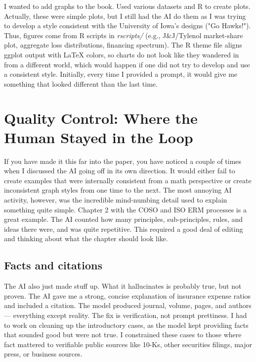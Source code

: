 \documentclass[11pt,letterpaper]{article}
\begin{document}
I wanted to add graphs to the book. Used various datasets and R to create plots. Actually, these were simple plots, but I still had the AI do them as I was trying to develop a style consistent with the University of Iowa's designs ("Go Hawks!"). Thus, figures come from R scripts in \textit{rscripts/} (e.g., J\&J/Tylenol market-share plot, aggregate loss distributions, financing spectrum). The R theme file aligns ggplot output with LaTeX colors, so charts do not look like they wandered in from a different world, which would happen if one did not try to develop and use a consistent style. Initially, every time I provided a prompt, it would give me something that looked different than the last time. 

\section{Quality Control: Where the Human Stayed in the Loop}

If you have made it this far into the paper, you have noticed a couple of times when I discussed the AI going off in its own direction. It would either fail to create examples that were internally consistent from a math perspective or create inconsistent graph styles from one time to the next. The most annoying AI activity, however, was the incredible mind-numbing detail used to explain something quite simple. Chapter 2 with the COSO and ISO ERM processes is a great example. The AI counted how many principles, sub-principles, rules, and ideas there were, and was quite repetitive. This required a good deal of editing and thinking about what the chapter should look like.  

\subsection{Facts and citations}

The AI also just made stuff up. What it hallucinates is probably true, but not proven. The AI gave me a strong, concise explanation of insurance expense ratios and included a citation.  The model produced journal, volume, pages, and authors — everything except reality. The fix is verification, not prompt prettiness. I had to work on cleaning up the introductory cases, as the model kept providing facts that sounded good but were not true. I constrained these cases to those where fact mattered to verifiable public sources like 10-Ks, other securities filings, major press, or business sources.
\end{document}
